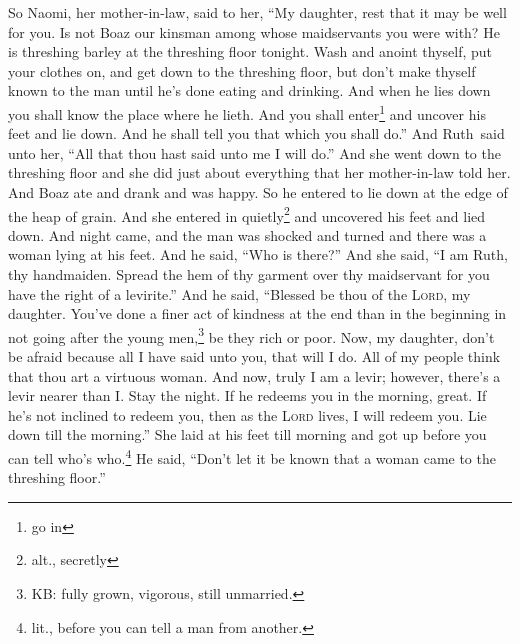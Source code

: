 
\begin{inparaenum}
     So Naomi, her mother-in-law, said to her, ``My daughter, rest that it may be well for you.%
     Is not Boaz our kinsman among whose maidservants you were with? He is threshing barley at the threshing floor tonight.%
     Wash and anoint thyself, put your clothes on, and get down to the threshing floor, but don't make thyself known to the man until he's done eating and drinking.%
     And when he lies down you shall know the place where he lieth. And you shall enter\footnote{go in} and uncover his feet and lie down. And he shall tell you that which you shall do.''%
     And Ruth\understood\ said unto her, ``All that thou hast said unto me I will do.''%
     And she went down to the threshing floor and she did just about everything that her mother-in-law told her.%
     And Boaz ate and drank and was happy. So he entered to lie down at the edge of the heap of grain. And she entered in quietly\footnote{alt., secretly} and uncovered his feet and lied down.%
     And night came, and the man was shocked and turned and there was a woman lying at his feet.%
     And he said, ``Who is there?'' And she said, ``I am Ruth, thy handmaiden. Spread the hem of thy garment over thy maidservant for you have the right of a levirite.''%
     And he said, ``Blessed be thou of the \textsc{Lord}, my daughter. You've done a finer act of kindness at the end than in the beginning in not going after the young men,\footnote{KB: fully grown, vigorous, still unmarried.} be they rich or poor.%
     Now, my daughter, don't be afraid because all I have said unto you, that will I do. All of my people think that thou art a virtuous woman.%
     And now, truly I am a levir; however, there's a levir nearer than I.%
     Stay the night. If he redeems you in the morning, great. If he's not inclined to redeem you, then as the \textsc{Lord} lives, I will redeem you. Lie down till the morning.''%
     She laid at his feet till morning and got up before you can tell who's who.\footnote{lit., before you can tell a man from another.} He said, ``Don't let it be known that a woman came to the threshing floor.''%

\end{inparaenum}
